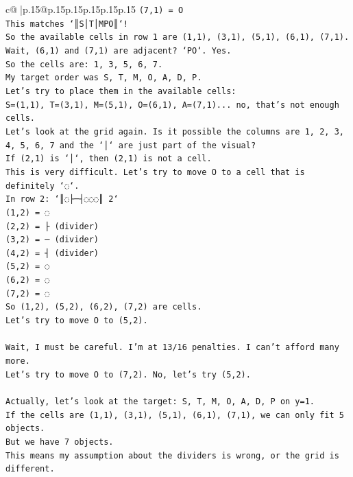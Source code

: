 \documentclass{article}
\begin{document}
{\begin{supertabular}{c@{$\;$}|p{.15\linewidth}@{}p{.15\linewidth}p{.15\linewidth}p{.15\linewidth}p{.15\linewidth}p{.15\linewidth}}
{{{\texttt{(7,1) = O} \\
\texttt{This matches `║S│T│MPO║`!} \\
\texttt{So the available cells in row 1 are (1,1), (3,1), (5,1), (6,1), (7,1).} \\
\texttt{Wait, (6,1) and (7,1) are adjacent? `PO`. Yes.} \\
\texttt{So the cells are: 1, 3, 5, 6, 7.} \\
\texttt{My target order was S, T, M, O, A, D, P.} \\
\texttt{Let's try to place them in the available cells:} \\
\texttt{S=(1,1), T=(3,1), M=(5,1), O=(6,1), A=(7,1)... no, that's not enough cells.} \\
\texttt{Let's look at the grid again. Is it possible the columns are 1, 2, 3, 4, 5, 6, 7 and the `│` are just part of the visual?} \\
\texttt{If (2,1) is `│`, then (2,1) is not a cell.} \\
\texttt{This is very difficult. Let's try to move O to a cell that is definitely `◌`.} \\
\texttt{In row 2: `║◌├─┤◌◌◌║ 2`} \\
\texttt{(1,2) = ◌} \\
\texttt{(2,2) = ├ (divider)} \\
\texttt{(3,2) = ─ (divider)} \\
\texttt{(4,2) = ┤ (divider)} \\
\texttt{(5,2) = ◌} \\
\texttt{(6,2) = ◌} \\
\texttt{(7,2) = ◌} \\
\texttt{So (1,2), (5,2), (6,2), (7,2) are cells.} \\
\texttt{Let's try to move O to (5,2).} \\
\\ 
\texttt{Wait, I must be careful. I'm at 13/16 penalties. I can't afford many more.} \\
\texttt{Let's try to move O to (7,2). No, let's try (5,2).} \\
\\ 
\texttt{Actually, let's look at the target: S, T, M, O, A, D, P on y=1.} \\
\texttt{If the cells are (1,1), (3,1), (5,1), (6,1), (7,1), we can only fit 5 objects.} \\
\texttt{But we have 7 objects.} \\
\texttt{This means my assumption about the dividers is wrong, or the grid is different.} \\
}}}
\end{supertabular}}
\end{document}
